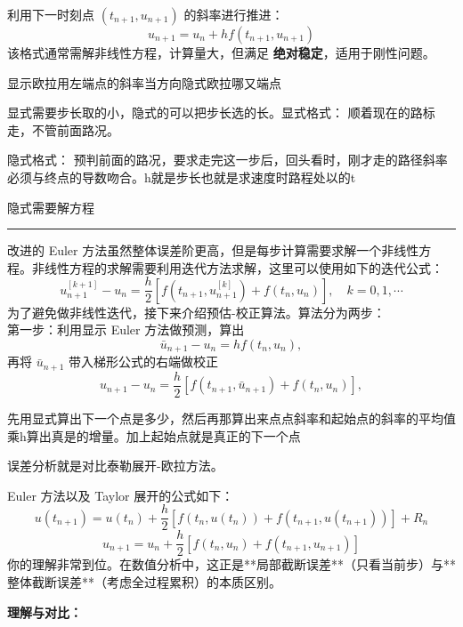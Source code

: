 \begin{definition}[隐式 Euler 格式]利用下一时刻点 $(t_{n+1}, u_{n+1})$ 的斜率进行推进：\begin{equation}u_{n+1} = u_n + h f(t_{n+1}, u_{n+1})\end{equation}该格式通常需解非线性方程，计算量大，但满足 \textbf{绝对稳定}，适用于刚性问题。\end{definition}
显示欧拉用左端点的斜率当方向隐式欧拉哪又端点
\begin{dxtips}
    显式需要步长取的小，隐式的可以把步长选的长。显式格式： 顺着现在的路标走，不管前面路况。

隐式格式： 预判前面的路况，要求走完这一步后，回头看时，刚才走的路径斜率必须与终点的导数吻合。h就是步长也就是求速度时路程处以的t
\end{dxtips}
\begin{dxtips}
    隐式需要解方程
\end{dxtips}

\rule{\textwidth}{0.4pt}

改进的 Euler 方法虽然整体误差阶更高，但是每步计算需要求解一个非线性方程。非线性方程的求解需要利用迭代方法求解，这里可以使用如下的迭代公式：
\[
u_{n+1}^{[k+1]} - u_{n} = \frac{h}{2} [ f(t_{n+1}, u_{n+1}^{[k]}) + f(t_{n}, u_{n}) ], \quad k = 0, 1, \cdots
\]
为了避免做非线性迭代，接下来介绍预估-校正算法。算法分为两步：\\
第一步：利用显示 Euler 方法做预测，算出
\[
\bar{u}_{n+1} - u_{n} = h f(t_{n}, u_{n}),
\]
再将 $\bar{u}_{n+1}$ 带入梯形公式的右端做校正
\[
u_{n+1} - u_{n} = \frac{h}{2} [ f(t_{n+1}, \bar{u}_{n+1}) + f(t_{n}, u_{n}) ],
\]
\begin{dxtips}
    先用显式算出下一个点是多少，然后再那算出来点点斜率和起始点的斜率的平均值乘h算出真是的增量。加上起始点就是真正的下一个点
\end{dxtips}
\begin{dxtips}[误差分析]
    误差分析就是对比泰勒展开-欧拉方法。
\end{dxtips}
Euler 方法以及 Taylor 展开的公式如下：
\[
u(t_{n+1}) = u(t_n) + \frac{h}{2} [f(t_n, u(t_n)) + f(t_{n+1}, u(t_{n+1}))] + R_n
\]
\[
u_{n+1} = u_n + \frac{h}{2} [f(t_n, u_n) + f(t_{n+1}, u_{n+1})]
\]
你的理解非常到位。在数值分析中，这正是**局部截断误差**（只看当前步）与**整体截断误差**（考虑全过程累积）的本质区别。


\noindent \textbf{理解与对比：}

